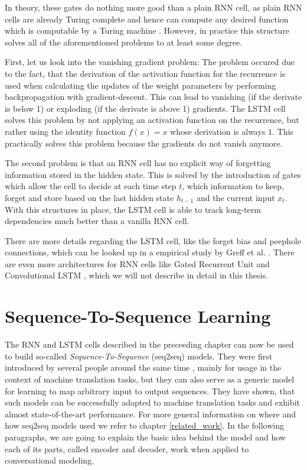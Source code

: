 In theory, these gates do nothing more good than a plain RNN cell, as plain RNN cells are already Turing complete and hence can compute any desired function which is computable by a Turing machine \cite{Siegelmann:1995}. However, in practice this structure solves all of the aforementioned problems to at least some degree.

First, let us look into the vanishing gradient problem: The problem occured due to the fact, that the derivation of the activation function for the recurrence is used when calculating the updates of the weight parameters by performing backpropagation with gradient-descent. This can lead to vanishing (if the derivate is below 1) or exploding (if the derivate is above 1) gradients. The LSTM cell solves this problem by not applying an activation function on the recurrence, but rather using the identity function $f(x) = x$ whose derivation is always $1$. This practically solves this problem because the gradients do not vanish anymore.

The second problem is that an RNN cell has no explicit way of forgetting information stored in the hidden state. This is solved by the introduction of gates which allow the cell to decide at each time step $t$, which information to keep, forget and store based on the last hidden state $h_{t-1}$ and the current input $x_t$. With this structures in place, the LSTM cell is able to track long-term dependencies much better than a vanilla RNN cell.

There are more details regarding the LSTM cell, like the forget bias and peephole connections, which can be looked up in a empirical study by Greff et al. \cite{Greff:2016}. There are even more architectures for RNN cells like Gated Recurrent Unit \cite{Chung:2014} and Convolutional LSTM \cite{Xingjian:2015}, which we will not describe in detail in this thesis.

\section{Sequence-To-Sequence Learning}
\label{fundamentals:seq2seq}
The RNN and LSTM cells described in the preceeding chapter can now be used to build so-called \emph{Sequence-To-Sequence} (seq2seq) models. They were first introduced by several people around the same time \cite{Sutskever:2014}\cite{Kalchbrenner:2013}\cite{Cho:2014}, mainly for usage in the context of machine translation tasks, but they can also serve as a generic model for learning to map arbitrary input to output sequences. They have shown, that such models can be successfully adapted to machine translation tasks and exhibit almost state-of-the-art performance. For more general information on where and how seq2seq models used we refer to chapter \ref{related_work}. In the following paragraphs, we are going to explain the basic idea behind the model and how each of its parts, called encoder and decoder, work when applied to conversational modeling.

